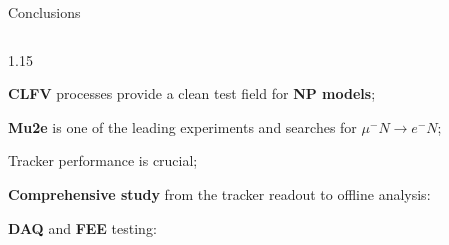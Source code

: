 \documentclass{beamer}
\begin{document}
\begin{frame}{Conclusions}
\vspace{-3mm}
\begin{columns}
\begin{column}{1.15\framewidth}
 \setlength{\leftmargini}{1.2em}
    \begin{itemize}
        {\footnotesize
\item \textbf{CLFV} processes provide a clean test field for \textbf{NP models};
\vspace{1.2mm}
\item \textbf{Mu2e} is one of the leading experiments and searches for $ \mu^- N \rightarrow e^- N $;
\vspace{1.2mm}
\item Tracker performance is crucial;
\vspace{1.2mm}
    \item \textbf{Comprehensive study} from the tracker readout to offline analysis:}
   \begin{itemize}
      \vspace{1.2mm}
      {\footnotesize \item \textbf{DAQ} and \textbf{FEE} testing:}
   \vspace{1mm}
      \begin{itemize}
          

\end{itemize}
\end{itemize}
\end{itemize}
\end{column}
\end{columns}
\end{frame}
\end{document}
